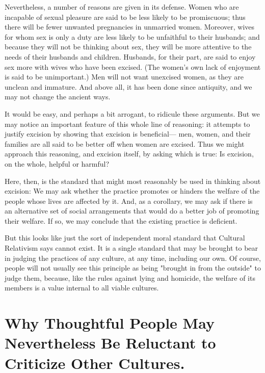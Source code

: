 Nevertheless, a number of reasons are given in its defense. Women who 
are incapable of sexual pleasure are said to be less likely  to be 
promiscuous; thus there will be fewer unwanted pregnancies in 
unmarried women. Moreover, wives for whom sex is only a duty are less 
likely  to  be  unfaithful  to  their  husbands;  and  because  they  will  not  be 
thinking  about  sex,  they  will  be  more  attentive  to  the  needs  of  their 
husbands  and  children.  Husbands,  for  their  part,  are  said  to  enjoy  sex 
more  with  wives  who  have  been  excised.  (The  women's  own  lack  of 
enjoyment  is  said  to  be  unimportant.)  Men  will  not  want  unexcised 
women,  as  they  are  unclean  and  immature.  And  above  all,  it  has  been 
done since antiquity, and we may not change the ancient ways. 

It would be easy, and perhaps a bit arrogant, to ridicule these 
arguments. But we may notice an important feature of this whole line of 
reasoning:  it  attempts  to  justify  excision  by  showing  that  excision  is 
beneficial— men,  women,  and their  families  are  all  said  to be  better  off 
when women are excised. Thus we might approach this reasoning, and 
excision itself, by asking which is true: Is excision, on the whole, helpful 
or harmful? 

Here,  then,  is  the  standard  that  might  most  reasonably  be  used  in 
thinking  about  excision:  We  may  ask  whether  the  practice  promotes  or 
hinders the welfare of the people whose lives are affected by it. And, as 
a corollary, we may ask if there is an alternative set of social 
arrangements that would do a better job of promoting their welfare. If so, 
we may conclude that the existing practice is deficient. 

But  this  looks  like  just  the  sort  of  independent  moral  standard  that 
Cultural Relativism says cannot exist. It is a single standard that may be 
brought  to  bear  in  judging  the practices  of  any  culture,  at  any  time, 
including our own. Of course, people will not usually see this principle as 
being "brought in from the outside" to judge them, because, like the rules 
against lying and homicide, the welfare of its members is a value internal 
to all viable cultures. 

\section{Why Thoughtful People  May Nevertheless  Be Reluctant to Criticize 
Other Cultures.}

